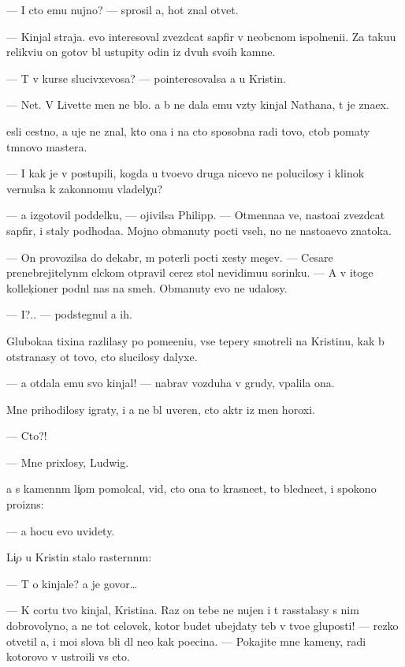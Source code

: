 \documentclass[10pt]{book}
\begin{document}
— I cto {\y}emu nujno? — sprosil {\y}a, hot{\ia} znal otvet.

— Kinjal straja. {\Y}evo interesoval zvezdcat{\yi}{\y} sapfir v neob{\yi}cnom ispolneni{\y}i. Za taku{\y}u relikvi{\y}u on gotov b{\yi}l ustupity odin iz dvuh svo{\y}ih kamne{\y}.

— T{\yi} v kurse slucivxevosa? — pointeresovalsa {\y}a u Kristin{\yi}.

— Net. V Livette men{\ia} ne b{\yi}lo. {\Y}a b{\yi} ne dala {\y}emu vz{\ia}ty kinjal Nathana, t{\yi} je zna{\y}ex.

{\Y}esli cestno, {\y}a uje ne znal, kto ona i na cto sposobna radi tovo, ctob{\yi} po{\y}maty t{\e}mnovo mastera.

— I kak je v{\yi} postupili, kogda u tvo{\y}evo druga nicevo ne polucilosy i klinok vernulsa k zakonnomu vladely{\c}u?

— {\Y}a izgotovil poddelku, — ojivilsa Philipp. — Otmenna{\y}a ve{\x}, nasto{\y}a{\x}i{\y} zvezdcat{\yi}{\y} sapfir, i staly podhod{\ia}{\x}a{\y}a. Mojno obmanuty pocti vseh, no ne nasto{\y}a{\x}evo znatoka.

— On provozilsa do dekabr{\ia}, m{\yi} poter{\ia}li pocti xesty mes{\ia}{\c}ev. — Cesare prenebrejitelyn{\yi}m {\x}elckom otpravil cerez stol nevidimu{\y}u sorinku. — A v itoge kollek{\c}ioner podn{\ia}l nas na smeh. Obmanuty {\y}evo ne udalosy.

— I?.. — podstegnul {\y}a ih.

Gluboka{\y}a tixina razlilasy po pome{\x}eni{\y}u, vse tepery smotreli na Kristinu, kak b{\yi} otstran{\ia}{\y}asy ot tovo, cto slucilosy dalyxe.

— {\Y}a otdala {\y}emu svo{\y} kinjal! — nabrav vozduha v grudy, v{\yi}palila ona.

Mne prihodilosy igraty, i {\y}a ne b{\yi}l uveren, cto akt{\e}r iz men{\ia} horoxi{\y}.

— Cto?!

— Mne prixlosy, Ludwig.

{\Y}a s kamenn{\yi}m li{\c}om pomolcal, vid{\ia}, cto ona to krasne{\y}et, to bledne{\y}et, i spoko{\y}no proizn{\e}s:

— {\Y}a hocu {\y}evo uvidety.

Li{\c}o u Kristin{\yi} stalo raster{\ia}nn{\yi}m:

— T{\yi} o kinjale? {\Y}a je govor{\iu}…

— K cortu tvo{\y} kinjal, Kristina. Raz on tebe ne nujen i t{\yi} rasstalasy s nim dobrovolyno, {\y}a ne tot celovek, kotor{\yi}{\y} budet ubejdaty teb{\ia} v tvo{\y}e{\y} gluposti! — rezko otvetil {\y}a, i mo{\y}i slova b{\yi}li dl{\ia} ne{\y}o kak po{\x}ecina. — Pokajite mne kameny, radi kotorovo v{\yi} ustro{\y}ili vs{\e} eto.
\end{document}
